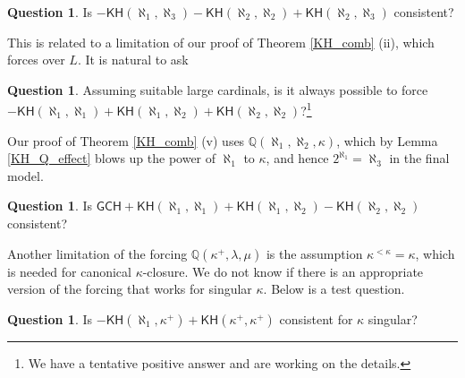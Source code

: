 \documentclass[10pt,reqno]{amsart}
\theoremstyle{plain}
\theoremstyle{definition}
\newtheorem{question}[theorem]{Question}
\theoremstyle{remark}
\begin{document}
\begin{question}
Is $-\mathsf{KH}(\aleph_1,\aleph_3)-\mathsf{KH}(\aleph_2,\aleph_2)+\mathsf{KH}(\aleph_2,\aleph_3)$ consistent?
\end{question}

This is related to a limitation of our proof of Theorem \ref{KH_comb} (ii), which forces over $L$. It is natural to ask

\begin{question}
Assuming suitable large cardinals, is it always possible to force $-\mathsf{KH}(\aleph_1,\aleph_1)+\mathsf{KH}(\aleph_1,\aleph_2)+\mathsf{KH}(\aleph_2,\aleph_2)$?\footnote{We have a tentative positive answer and are working on the details.}
\end{question}


Our proof of Theorem \ref{KH_comb} (v) uses $\mathbb{Q}(\aleph_1,\aleph_2,\kappa)$, which by Lemma \ref{KH_Q_effect} blows up the power of $\aleph_1$ to $\kappa$, and hence $2^{\aleph_1}=\aleph_3$ in the final model.

\begin{question}
Is $\mathsf{GCH}+\mathsf{KH}(\aleph_1,\aleph_1)+\mathsf{KH}(\aleph_1,\aleph_2)-\mathsf{KH}(\aleph_2,\aleph_2)$ consistent?
\end{question}


Another limitation of the forcing $\mathbb{Q}(\kappa^+,\lambda,\mu)$ is the assumption $\kappa^{<\kappa}=\kappa$, which is needed for canonical $\kappa$-closure. We do not know if there is an appropriate version of the forcing that works for singular $\kappa$. Below is a test question.

\begin{question}
Is $-\mathsf{KH}(\aleph_1,\kappa^+)+\mathsf{KH}(\kappa^+,\kappa^+)$ consistent for $\kappa$ singular?
\end{question}






\end{document}
